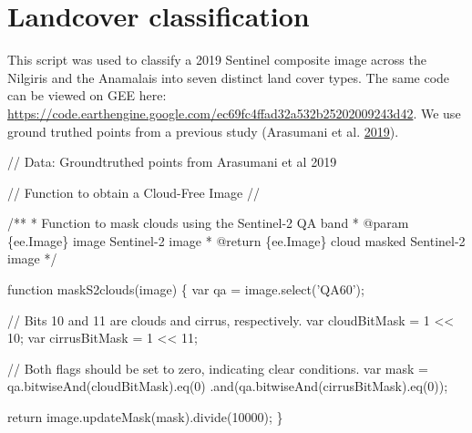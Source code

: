 \documentclass[]{article}
\newenvironment{Shaded}{}{}
\newcommand{\AnnotationTok}[1]{\textcolor[rgb]{0.00,0.50,0.00}{#1}}
\newcommand{\AttributeTok}[1]{#1}
\newcommand{\CommentTok}[1]{\textcolor[rgb]{0.00,0.50,0.00}{#1}}
\newcommand{\CommentVarTok}[1]{\textcolor[rgb]{0.00,0.50,0.00}{#1}}
\newcommand{\ControlFlowTok}[1]{\textcolor[rgb]{0.00,0.00,1.00}{#1}}
\newcommand{\DecValTok}[1]{#1}
\newcommand{\KeywordTok}[1]{\textcolor[rgb]{0.00,0.00,1.00}{#1}}
\newcommand{\NormalTok}[1]{#1}
\newcommand{\OperatorTok}[1]{#1}
\newcommand{\StringTok}[1]{\textcolor[rgb]{0.00,0.50,0.50}{#1}}
\newcommand{\VariableTok}[1]{#1}
\begin{document}
\hypertarget{landcover-classification}{%
\section{Landcover classification}\label{landcover-classification}}

This script was used to classify a 2019 Sentinel composite image across the Nilgiris and the Anamalais into seven distinct land cover types. The same code can be viewed on GEE here: \url{https://code.earthengine.google.com/ec69fc4ffad32a532b25202009243d42}.
We use ground truthed points from a previous study (Arasumani et al. \protect\hyperlink{ref-arasumani2019}{2019}).

\begin{Shaded}
\begin{Highlighting}[numbers=left,,]
\CommentTok{// Data: Groundtruthed points from Arasumani et al 2019}

\CommentTok{// Function to obtain a Cloud-Free Image // }

\CommentTok{/**}
\CommentTok{ * Function to mask clouds using the Sentinel-2 QA band}
\CommentTok{ * }\AnnotationTok{@param}\CommentTok{ }\CommentVarTok{\{ee.Image\}}\CommentTok{ image Sentinel-2 image}
\CommentTok{ * }\AnnotationTok{@return}\CommentTok{ \{ee.Image\} cloud masked Sentinel-2 image}
\CommentTok{ */}
 
\KeywordTok{function} \AttributeTok{maskS2clouds}\NormalTok{(image) }\OperatorTok{\{}
  \KeywordTok{var}\NormalTok{ qa }\OperatorTok{=} \VariableTok{image}\NormalTok{.}\AttributeTok{select}\NormalTok{(}\StringTok{'QA60'}\NormalTok{)}\OperatorTok{;}

  \CommentTok{// Bits 10 and 11 are clouds and cirrus, respectively.}
  \KeywordTok{var}\NormalTok{ cloudBitMask }\OperatorTok{=} \DecValTok{1} \OperatorTok{<<} \DecValTok{10}\OperatorTok{;}
  \KeywordTok{var}\NormalTok{ cirrusBitMask }\OperatorTok{=} \DecValTok{1} \OperatorTok{<<} \DecValTok{11}\OperatorTok{;}

  \CommentTok{// Both flags should be set to zero, indicating clear conditions.}
  \KeywordTok{var}\NormalTok{ mask }\OperatorTok{=} \VariableTok{qa}\NormalTok{.}\AttributeTok{bitwiseAnd}\NormalTok{(cloudBitMask).}\AttributeTok{eq}\NormalTok{(}\DecValTok{0}\NormalTok{)}
\NormalTok{      .}\AttributeTok{and}\NormalTok{(}\VariableTok{qa}\NormalTok{.}\AttributeTok{bitwiseAnd}\NormalTok{(cirrusBitMask).}\AttributeTok{eq}\NormalTok{(}\DecValTok{0}\NormalTok{))}\OperatorTok{;}

  \ControlFlowTok{return} \VariableTok{image}\NormalTok{.}\AttributeTok{updateMask}\NormalTok{(mask).}\AttributeTok{divide}\NormalTok{(}\DecValTok{10000}\NormalTok{)}\OperatorTok{;}
\OperatorTok{\}}


\end{Highlighting}
\end{Shaded}
\end{document}

